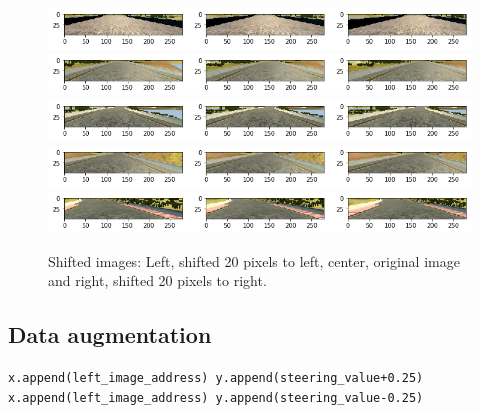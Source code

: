 \documentclass[12pt,a4paper]{article}
\begin{document}
	\begin{figure}[H]
		\centering
		\includegraphics[width=0.9\linewidth]{writeup_figures/shifted_image_1}
		\includegraphics[width=0.9\linewidth]{writeup_figures/shifted_image_2}
		\includegraphics[width=0.9\linewidth]{writeup_figures/shifted_image_3}
		\includegraphics[width=0.9\linewidth]{writeup_figures/shifted_image_4}
		\includegraphics[width=0.9\linewidth]{writeup_figures/shifted_image_5}
		\caption{Shifted images: Left, shifted 20 pixels to left, center, original image and right, shifted 20 pixels to right.}
		\label{fig:shiftedimages}
	\end{figure}

	\subsection{Data augmentation}
	
		\noindent\texttt{x.append(left\_image\_address)\newline
		y.append(steering\_value+0.25)\newline
		x.append(left\_image\_address)\newline
		y.append(steering\_value-0.25)}
	
\end{document}
